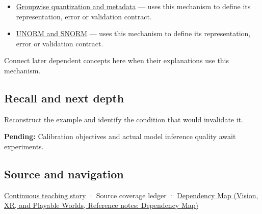 \hypertarget{appendix-d5da3eaabaef-used-by}{}

\begin{itemize}
\tightlist
\item
  \hyperref[appendix-638204c40e8b]{Groupwise quantization and metadata} --- uses this mechanism to define its representation, error or validation contract.
\item
  \hyperref[appendix-b2402c453dac]{UNORM and SNORM} --- uses this mechanism to define its representation, error or validation contract.
\end{itemize}

Connect later dependent concepts here when their explanations use this mechanism.

\subsection{Recall and next depth}\label{appendix-d5da3eaabaef-recall-and-next-depth}

\hypertarget{appendix-d5da3eaabaef-recall-and-next-depth}{}

Reconstruct the example and identify the condition that would invalidate it.

\textbf{Pending:} Calibration objectives and actual model inference quality await experiments.

\subsection{Source and navigation}\label{appendix-d5da3eaabaef-source-and-navigation}

\hypertarget{appendix-d5da3eaabaef-source-and-navigation}{}

\hyperref[01-foundations-i-ch001-choosing-what-information-to-keep]{Continuous teaching story} · {Source coverage ledger} · \href{../07-Vision-XR-and-Playable-Worlds/main.pdf\#nameddest=appendix-4ad47bdd269a}{Dependency Map (Vision, XR, and Playable Worlds, Reference notes: Dependency Map)}
